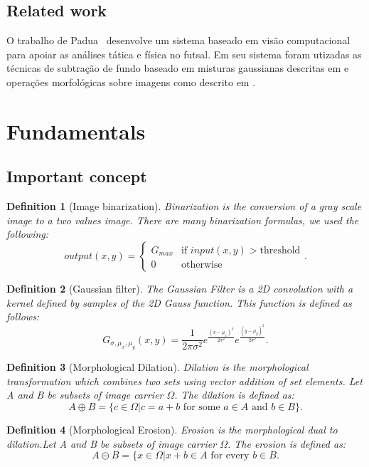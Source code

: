 \documentclass[10pt, conference]{IEEEtran}
\newtheorem{definition}{Definition}
\begin{document}
\subsection{Related work}
O trabalho de Padua~\cite{padua2014sistema} desenvolve um sistema baseado em visão computacional para apoiar as análises tática e física no futsal. Em seu sistema foram utizadas as técnicas de subtração de fundo baseado em misturas gaussianas descritas em \cite{zivkovic2004improved} e operações morfológicas sobre imagens como descrito em \cite{haralick1987image}.

\section{Fundamentals}
\subsection{Important concept}
\begin{definition}[Image binarization]
	Binarization is the conversion of a gray scale image to a two values image. There are many binarization formulas, we used the following:
	\[
		output(x,y) =
	\begin{cases}
		G_{max} & \text{if } input(x,y) > \text{threshold}\\
		0 & \text{otherwise}
	\end{cases}.
	\]
\end{definition}
\begin{definition}[Gaussian filter]
	The Gaussian Filter is a 2D convolution with a kernel defined by samples of the 2D Gauss function. This function is defined as follows:
			$$ G_{\sigma,\mu_{x},\mu_{y}}(x,y)=\frac{1}{2\pi\sigma^{2}}
			e^{\frac{(x-\mu_{x})^{2}}{2\sigma^{2}}}
			e^{\frac{(y-\mu_{y})^{2}}{2\sigma^{2}}}.$$
	
\end{definition}
\begin{definition}[Morphological Dilation]
	Dilation is the morphological transformation which combines two sets using vector addition of set elements. Let A and B be subsets of image carrier $\Omega$. The dilation is defined as: $$A \oplus B=\{c\in\Omega|c=a+b \text{ for some }a\in A\text{  and }b \in B\}.$$
\end{definition}

\begin{definition}[Morphological Erosion]
Erosion is the morphological dual to dilation.Let A and B be subsets of image carrier $\Omega$. The erosion is defined as: $$A \ominus B=\{x\in\Omega | x+b \in A \text{ for every }b\in B.$$
\end{definition}
\end{document}
